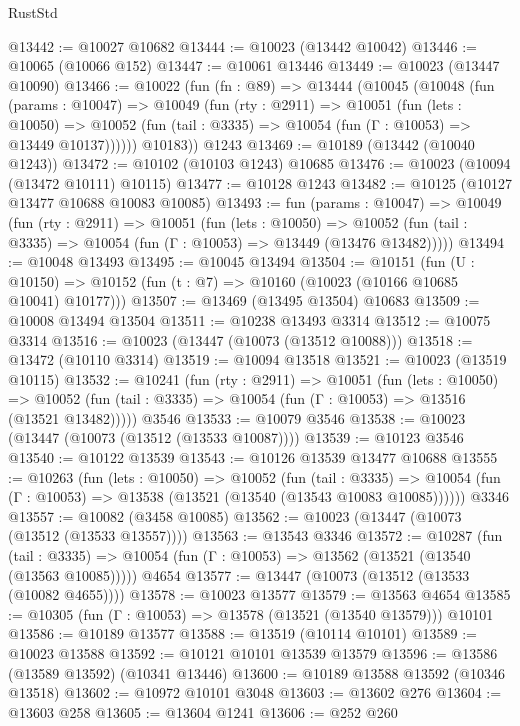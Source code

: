\begin{lexlean}{RustStd}
\begin{coremodule}
@13442 := @10027 @10682
@13444 := @10023 (@13442 @10042)
@13446 := @10065 (@10066 @152)
@13447 := @10061 @13446
@13449 := @10023 (@13447 @10090)
@13466 := @10022
    (fun (fn : @89) =>
    @13444
      (@10045
        (@10048
          (fun (params : @10047) =>
          @10049
            (fun (rty : @2911) =>
            @10051
              (fun (lets : @10050) =>
              @10052 (fun (tail : @3335) => @10054 (fun (Γ : @10053) => @13449 @10137))))))
        @10183))
    @1243
@13469 := @10189 (@13442 (@10040 @1243))
@13472 := @10102 (@10103 @1243) @10685
@13476 := @10023 (@10094 (@13472 @10111) @10115)
@13477 := @10128 @1243
@13482 := @10125 (@10127 @13477 @10688 @10083 @10085)
@13493 := fun (params : @10047) =>
  @10049
    (fun (rty : @2911) =>
    @10051
      (fun (lets : @10050) =>
      @10052 (fun (tail : @3335) => @10054 (fun (Γ : @10053) => @13449 (@13476 @13482)))))
@13494 := @10048 @13493
@13495 := @10045 @13494
@13504 := @10151
    (fun (U : @10150) => @10152 (fun (t : @7) => @10160 (@10023 (@10166 @10685 @10041) @10177)))
@13507 := @13469 (@13495 @13504) @10683
@13509 := @10008 @13494 @13504
@13511 := @10238 @13493 @3314
@13512 := @10075 @3314
@13516 := @10023 (@13447 (@10073 (@13512 @10088)))
@13518 := @13472 (@10110 @3314)
@13519 := @10094 @13518
@13521 := @10023 (@13519 @10115)
@13532 := @10241
    (fun (rty : @2911) =>
    @10051
      (fun (lets : @10050) =>
      @10052 (fun (tail : @3335) => @10054 (fun (Γ : @10053) => @13516 (@13521 @13482)))))
    @3546
@13533 := @10079 @3546
@13538 := @10023 (@13447 (@10073 (@13512 (@13533 @10087))))
@13539 := @10123 @3546
@13540 := @10122 @13539
@13543 := @10126 @13539 @13477 @10688
@13555 := @10263
    (fun (lets : @10050) =>
    @10052
      (fun (tail : @3335) =>
      @10054 (fun (Γ : @10053) => @13538 (@13521 (@13540 (@13543 @10083 @10085))))))
    @3346
@13557 := @10082 (@3458 @10085)
@13562 := @10023 (@13447 (@10073 (@13512 (@13533 @13557))))
@13563 := @13543 @3346
@13572 := @10287
    (fun (tail : @3335) => @10054 (fun (Γ : @10053) => @13562 (@13521 (@13540 (@13563 @10085)))))
    @4654
@13577 := @13447 (@10073 (@13512 (@13533 (@10082 @4655))))
@13578 := @10023 @13577
@13579 := @13563 @4654
@13585 := @10305 (fun (Γ : @10053) => @13578 (@13521 (@13540 @13579))) @10101
@13586 := @10189 @13577
@13588 := @13519 (@10114 @10101)
@13589 := @10023 @13588
@13592 := @10121 @10101 @13539 @13579
@13596 := @13586 (@13589 @13592) (@10341 @13446)
@13600 := @10189 @13588 @13592 (@10346 @13518)
@13602 := @10972 @10101 @3048
@13603 := @13602 @276
@13604 := @13603 @258
@13605 := @13604 @1241
@13606 := @252 @260

\end{coremodule}
\end{lexlean}
